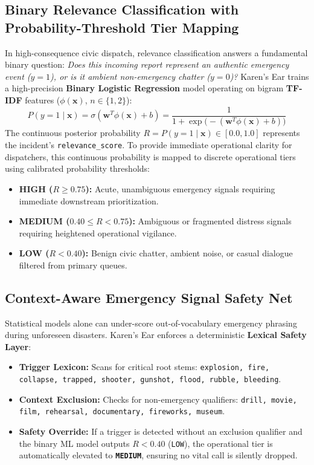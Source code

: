 \documentclass[10pt,a4paper]{article}
\begin{document}
\subsection{Binary Relevance Classification with Probability-Threshold Tier Mapping}
In high-consequence civic dispatch, relevance classification answers a fundamental binary question: \emph{Does this incoming report represent an authentic emergency event ($y=1$), or is it ambient non-emergency chatter ($y=0$)?} Karen's Ear trains a high-precision \textbf{Binary Logistic Regression} model operating on bigram \textbf{TF-IDF} features ($\phi(\mathbf{x})$, $n \in \{1, 2\}$):
\begin{equation}
  P(y = 1 \mid \mathbf{x}) = \sigma(\mathbf{w}^T \phi(\mathbf{x}) + b) = \frac{1}{1 + \exp\big(-(\mathbf{w}^T \phi(\mathbf{x}) + b)\big)}
\end{equation}
The continuous posterior probability $R = P(y = 1 \mid \mathbf{x}) \in [0.0, 1.0]$ represents the incident's \texttt{relevance\_score}. To provide immediate operational clarity for dispatchers, this continuous probability is mapped to discrete operational tiers using calibrated probability thresholds:
\begin{itemize}
  \item \textbf{HIGH ($R \ge 0.75$):} Acute, unambiguous emergency signals requiring immediate downstream prioritization.
  \item \textbf{MEDIUM ($0.40 \le R < 0.75$):} Ambiguous or fragmented distress signals requiring heightened operational vigilance.
  \item \textbf{LOW ($R < 0.40$):} Benign civic chatter, ambient noise, or casual dialogue filtered from primary queues.
\end{itemize}

\subsection{Context-Aware Emergency Signal Safety Net}
Statistical models alone can under-score out-of-vocabulary emergency phrasing during unforeseen disasters. Karen's Ear enforces a deterministic \textbf{Lexical Safety Layer}:
\begin{itemize}
  \item \textbf{Trigger Lexicon:} Scans for critical root stems: \texttt{explosion, fire, collapse, trapped, shooter, gunshot, flood, rubble, bleeding}.
  \item \textbf{Context Exclusion:} Checks for non-emergency qualifiers: \texttt{drill, movie, film, rehearsal, documentary, fireworks, museum}.
  \item \textbf{Safety Override:} If a trigger is detected without an exclusion qualifier and the binary ML model outputs $R < 0.40$ (\texttt{LOW}), the operational tier is automatically elevated to \textbf{\texttt{MEDIUM}}, ensuring no vital call is silently dropped.
\end{itemize}
\end{document}
